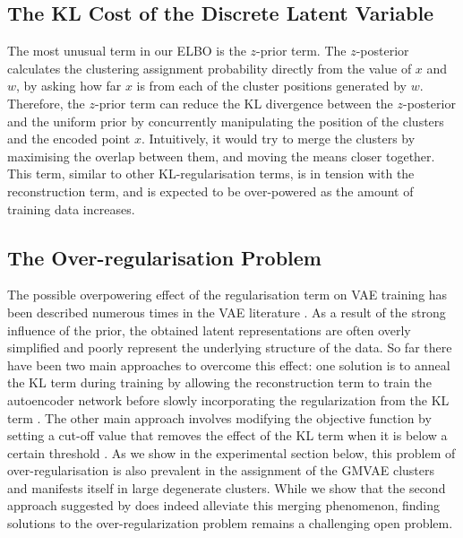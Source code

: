 \documentclass{article} \usepackage{iclr2017_conference,times}
\begin{document}
\subsection{The KL Cost of the Discrete Latent Variable}

The most unusual term in our ELBO is the $z$-prior term. The $z$-posterior calculates the clustering assignment probability directly from the value of $x$ and $w$, by asking how far $x$ is from each of the cluster positions generated by $w$. Therefore, the $z$-prior term can reduce the KL divergence between the $z$-posterior and the uniform prior by concurrently manipulating the position of the clusters and the encoded point $x$. Intuitively, it would try to merge the clusters by maximising the overlap between them, and moving the means closer together. This term, similar to other KL-regularisation terms, is in tension with the reconstruction term, and is expected to be over-powered as the amount of training data increases.

\subsection{The Over-regularisation Problem}

The possible overpowering effect of the regularisation term on VAE training has been described numerous times in the VAE literature \citep{bowman2015generating,sonderby2016train,kingma2016improving,chen2016variational}. As a result of the strong influence of the prior, the obtained latent representations are often overly simplified and poorly represent the underlying structure of the data.
So far there have been two main approaches to overcome this effect: one solution is to anneal the KL term during training by allowing the reconstruction term to train the autoencoder network before slowly incorporating the regularization from the KL term \citep{sonderby2016train}. The other main approach involves modifying the objective function by setting a cut-off value that removes the effect of the KL term when it is below a certain threshold \citep{kingma2016improving}.
As we show in the experimental section below, this problem of over-regularisation is also prevalent in the assignment of the GMVAE clusters and manifests itself in large degenerate clusters. While we show that the second approach suggested by \cite{kingma2016improving} does indeed alleviate this merging phenomenon, finding solutions to the over-regularization problem remains a challenging open problem.
\end{document}

